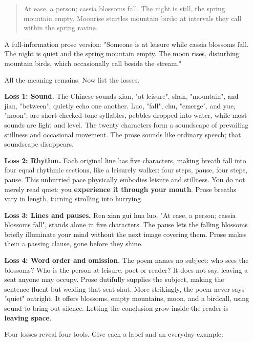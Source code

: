\begin{quote}
At ease, a person; cassia blossoms fall. The night is still, the spring mountain empty. Moonrise startles mountain birds; at intervals they call within the spring ravine.
\end{quote}
A full-information prose version: "Someone is at leisure while cassia blossoms fall. The night is quiet and the spring mountain empty. The moon rises, disturbing mountain birds, which occasionally call beside the stream."

All the meaning remains. Now list the losses.

\textbf{Loss 1: Sound.} The Chinese sounds xian, "at leisure", shan, "mountain", and jian, "between", quietly echo one another. Luo, "fall", chu, "emerge", and yue, "moon", are short checked-tone syllables, pebbles dropped into water, while most sounds are light and level. The twenty characters form a soundscape of prevailing stillness and occasional movement. The prose sounds like ordinary speech; that soundscape disappears.

\textbf{Loss 2: Rhythm.} Each original line has five characters, making breath fall into four equal rhythmic sections, like a leisurely walker: four steps, pause, four steps, pause. This unhurried pace physically embodies leisure and stillness. You do not merely read quiet; you \textbf{experience it through your mouth}. Prose breaths vary in length, turning strolling into hurrying.

\textbf{Loss 3: Lines and pauses.} Ren xian gui hua luo, "At ease, a person; cassia blossoms fall", stands alone in five characters. The pause lets the falling blossoms briefly illuminate your mind without the next image covering them. Prose makes them a passing clause, gone before they shine.

\textbf{Loss 4: Word order and omission.} The poem names no subject: who sees the blossoms? Who is the person at leisure, poet or reader? It does not say, leaving a seat anyone may occupy. Prose dutifully supplies the subject, making the sentence fluent but welding that seat shut. More strikingly, the poem never says "quiet" outright. It offers blossoms, empty mountains, moon, and a birdcall, using sound to bring out silence. Letting the conclusion grow inside the reader is \textbf{leaving space}.

Four losses reveal four tools. Give each a label and an everyday example:

